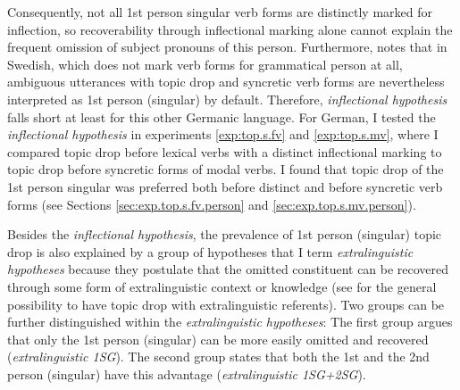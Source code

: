 Consequently, not all 1st person singular verb forms are distinctly marked for inflection, so recoverability  through inflectional marking alone cannot explain the frequent omission of subject pronouns of this person.
Furthermore, \citet[279]{sigurdsson2011} notes that in Swedish,  which does not mark verb forms for grammatical person at all, ambiguous  utterances with topic drop and syncretic  verb forms are nevertheless interpreted as 1st person (singular) by default.
Therefore,  \textit{inflectional hypothesis} falls short at least for this other Germanic language.
For German, I tested the \textit{inflectional hypothesis} in experiments \ref*{exp:top.s.fv} and \ref*{exp:top.s.mv}, where I compared topic drop before lexical verbs  with a distinct inflectional marking to topic drop before syncretic  forms of modal verbs. 
I found that topic drop of the 1st person singular was preferred both before distinct and before syncretic  verb forms (see Sections \ref{sec:exp.top.s.fv.person} and \ref{sec:exp.top.s.mv.person}).

Besides the \textit{inflectional hypothesis}, the prevalence of 1st person (singular) topic drop is also explained by a group of hypotheses that I term \textit{extralinguistic hypotheses} because they postulate that the omitted constituent can be recovered  through some form of extralinguistic context or knowledge (see  for the general possibility to have topic drop with extralinguistic referents).
Two groups can be further distinguished within the \textit{extralinguistic hypotheses}:
The first group argues that only the 1st person (singular) can be more easily omitted and recovered  (\textit{extralinguistic 1SG}).
The second group states that both the 1st and the 2nd person (singular) have this advantage (\textit{extralinguistic 1SG+2SG}).

